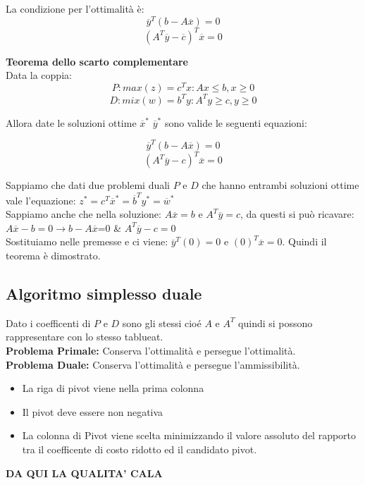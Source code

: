 \documentclass{article}
\begin{document}
La condizione per l'ottimalità è:
$$\overline{y}^T(b-A\overline{x})=0$$
$$(A^T\overline{y}-\overline{c})^T\overline{x}=0$$



\textbf{Teorema dello scarto complementare}\\
Data la coppia:
$$P: max(z)=c^Tx: Ax \le b, x \ge 0$$
$$D: mix(w)=b^Ty: A^Ty \ge c, y \ge 0$$

Allora date le soluzioni ottime $\overline{x}^{\ast}$ $\overline{y}^{\ast}$ sono valide le seguenti equazioni:

$$\overline{y}^T(b-A\overline{x})=0$$
$$(A^T\overline{y}-c)^T\overline{x}=0$$

\begin{tcolorbox}[
  colback=lightgray,
  colframe=black,
  coltext=black,
  title=Dimostrazione,
  colbacktitle=black,
  coltitle=lightgray,
  breakable
  ]
  Sappiamo che dati due problemi duali $P$ e $D$ che hanno entrambi soluzioni ottime vale l'equazione: $z^{\ast}=c^T\overline{x}^{\ast}=\overline{b}^Ty^{\ast}=\overline{w}^{\ast}$\\
  Sappiamo anche che nella soluzione: $A\overline{x}=b$ e $A^T\overline{y}=c$, da questi si può ricavare:\\
  $A\overline{x}-b=0\to b-A\overline{x}$=0 \& $A^T\overline{y}-c=0$\\
  Sostituiamo nelle premesse e ci viene: $\overline{y}^T(0)=0$ e $(0)^T\overline{x}=0$. Quindi il teorema è dimostrato.
\end{tcolorbox}

\subsection{Algoritmo simplesso duale}

Dato i coefficenti di $P$ e $D$ sono gli stessi cioé $A$ e $A^T$ quindi si possono rappresentare con lo stesso tablueat.\\
\textbf{Problema Primale:} Conserva l'ottimalità e persegue l'ottimalità.\\
\textbf{Problema Duale:} Conserva l'ottimalità e persegue l'ammissibilità.

\begin{itemize}
  \item La riga di pivot viene nella prima colonna
  \item Il pivot deve essere non negativa
  \item La colonna di Pivot viene scelta minimizzando il valore assoluto del rapporto tra il coefficente di costo ridotto ed il candidato pivot.
\end{itemize}
\textbf{DA QUI LA QUALITA' CALA}
\end{document}
